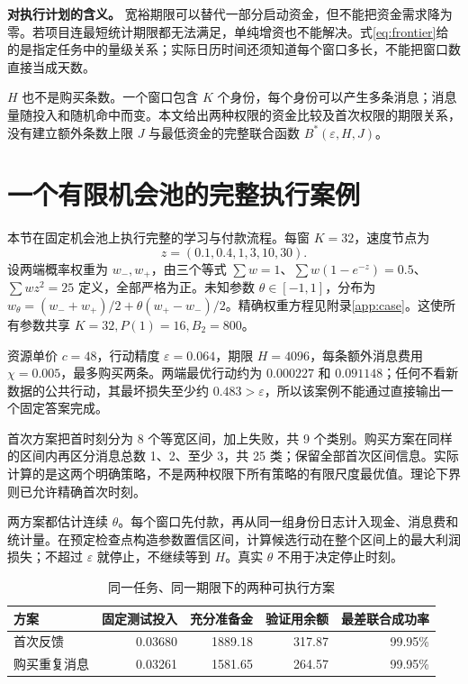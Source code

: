 \noindent\textbf{对执行计划的含义。}
宽裕期限可以替代一部分启动资金，但不能把资金需求降为零。若项目连最短统计期限都无法满足，单纯增资也不能解决。式\eqref{eq:frontier}给的是指定任务中的量级关系；实际日历时间还须知道每个窗口多长，不能把窗口数直接当成天数。

$H$ 也不是购买条数。一个窗口包含 $K$ 个身份，每个身份可以产生多条消息；消息量随投入和随机命中而变。本文给出两种权限的资金比较及首次权限的期限关系，没有建立额外条数上限 $J$ 与最低资金的完整联合函数 $B^*(\varepsilon,H,J)$。

\section{一个有限机会池的完整执行案例}\label{sec:case}
本节在固定机会池上执行完整的学习与付款流程。每窗 $K=32$，速度节点为
\[
 z=(0.1,0.4,1,3,10,30).
\]
设两端概率权重为 $w_-,w_+$，由三个等式 $\sum w=1$、$\sum w(1-e^{-z})=0.5$、$\sum wz^2=25$ 定义，全部严格为正。未知参数 $\theta\in[-1,1]$，分布为 $w_\theta=(w_-+w_+)/2+\theta(w_+-w_-)/2$。精确权重方程见附录\ref{app:case}。这使所有参数共享 $K=32,P(1)=16,B_2=800$。

资源单价 $c=48$，行动精度 $\varepsilon=0.064$，期限 $H=4096$，每条额外消息费用 $\chi=0.005$，最多购买两条。两端最优行动约为 $0.000227$ 和 $0.091148$；任何不看新数据的公共行动，其最坏损失至少约 $0.483>\varepsilon$，所以该案例不能通过直接输出一个固定答案完成。

首次方案把首时刻分为 8 个等宽区间，加上失败，共 9 个类别。购买方案在同样的区间内再区分消息总数 1、2、至少 3，共 25 类；保留全部首次区间信息。实际计算的是这两个明确策略，不是两种权限下所有策略的有限尺度最优值。理论下界则已允许精确首次时刻。

两方案都估计连续 $\theta$。每个窗口先付款，再从同一组身份日志计入现金、消息费和统计量。在预定检查点构造参数置信区间，计算候选行动在整个区间上的最大利润损失；不超过 $\varepsilon$ 就停止，不继续等到 $H$。真实 $\theta$ 不用于决定停止时刻。

\begin{table}[H]\centering
\caption{同一任务、同一期限下的两种可执行方案}\label{tab:case}
\begin{tabular}{lrrrr}\toprule
方案 & 固定测试投入 & 充分准备金 & 验证用余额 & 最差联合成功率\\\midrule
首次反馈 & 0.03680 & 1889.18 & 317.87 & 99.95\%\\
购买重复消息 & 0.03261 & 1581.65 & 264.57 & 99.95\%\\\bottomrule
\end{tabular}
\end{table}


